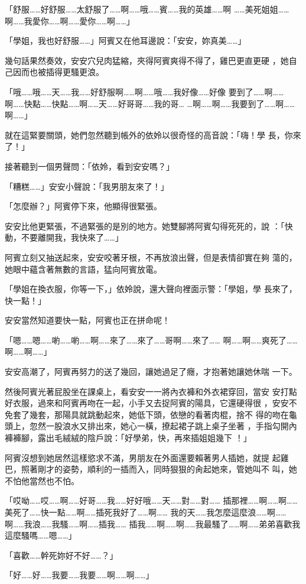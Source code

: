 「舒服……好舒服……太舒服了……啊……哦……賓……我的英雄……啊
……美死姐姐……啊……我愛你……啊……愛你……啊……」

「學姐，我也好舒服……」阿賓又在他耳邊說：「安安，妳真美……」

幾句話果然奏效，安安穴兒肉猛縮，夾得阿賓爽得不得了，雞巴更直更硬
，她自己因而也被插得更騷更浪。

「哦……哦……天……我……好舒服啊……啊……哦……我好像……好像
要到了……啊……啊……快點……快點……啊……天……好哥哥……我的哥…
…啊……啊……我要到了……啊……啊……」

就在這緊要關頭，她們忽然聽到帳外的依姈以很奇怪的高音說：「嗨！學
長，你來了！」

接著聽到一個男聲問：「依姈，看到安安嗎？」

「糟糕……」安安小聲說：「我男朋友來了！」

「怎麼辦？」阿賓停下來，他顯得很緊張。

安安比他更緊張，不過緊張的是別的地方。她雙腳將阿賓勾得死死的，說
：「快動，不要離開我，我快來了……」

阿賓立刻又抽送起來，安安咬著牙根，不再放浪出聲，但是表情卻實在夠
蕩的，她眼中蘊含著無數的言語，猛向阿賓放電。

「學姐在換衣服，你等一下，」依姈說，還大聲向裡面示警：「學姐，學
長來了，快一點！」

安安當然知道要快一點，阿賓也正在拼命呢！

「嗯……嗯……喲……喲……啊……來了……來了……哥啊……來了……
啊……啊……爽死了……啊……啊……」

安安高潮了，阿賓再努力的送了幾回，讓她過足了癮，才抱著她讓她休喘
一下。

然後阿賓光著屁股坐在課桌上，看安安一一將內衣褲和外衣裙穿回，當安
安打點好衣服，過來和阿賓再吻在一起，小手又去捉阿賓的陽具，它還硬得很
，安安不免套了幾套，那陽具就跳動起來，她低下頭，依戀的看著肉棍，捨不
得的吻在龜頭上，忽然一股浪水又排出來，她心一橫，撩起裙子跳上桌子坐著
，手指勾開內褲褲腳，露出毛絨絨的陰戶說：「好學弟，快，再來插姐姐幾下
！」

阿賓沒想到她居然這樣慾求不滿，男朋友在外面還要賴著男人插她，就提
起雞巴，照著剛才的姿勢，順利的一插而入，同時狠狠的肏起她來，管她叫不
叫，她不怕他當然也不怕。

「哎呦……哎……啊……好哥……我……好好哦……天……對……對……
插那裡……啊……啊……美死了……快一點……啊……插死我好了……啊……
我的天……我怎麼這麼浪……啊……啊……我浪……我騷……啊……插我……
插我……啊……啊……我最騷了……啊……弟弟喜歡我這麼騷嗎……嗯……」

「喜歡……幹死妳好不好……？」

「好……好……我要……我要……啊……啊……」

